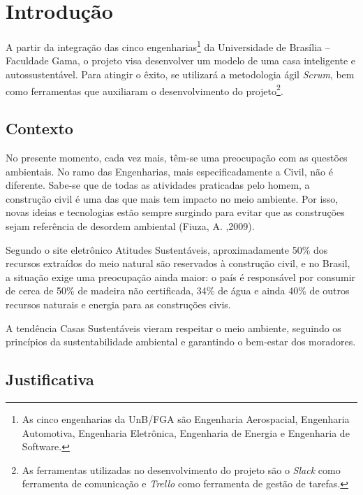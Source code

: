 \chapter[Introdução]{Introdução}

	A partir da integração das cinco engenharias\footnote{As cinco engenharias da UnB/FGA são Engenharia Aerospacial, Engenharia Automotiva, Engenharia Eletrônica, Engenharia de Energia e Engenharia de Software.} da Universidade de Brasília -- Faculdade Gama, o projeto visa desenvolver um modelo de uma casa inteligente e autossustentável. Para atingir o êxito, se utilizará a metodologia ágil \textit{Scrum}, bem como ferramentas que auxiliaram o desenvolvimento do projeto\footnote{As ferramentas utilizadas no desenvolvimento do projeto são o \textit{Slack} como ferramenta de comunicação e \textit{Trello} como ferramenta de gestão de tarefas.}.

\section{Contexto}

	No presente momento, cada vez mais, têm-se uma preocupação com as questões ambientais. No ramo das Engenharias, mais especificadamente a Civil, não é diferente. Sabe-se que de todas as atividades praticadas pelo homem, a construção civil é uma das que mais tem impacto no meio ambiente. Por isso, novas ideias e tecnologias estão sempre surgindo para evitar que as construções sejam referência de desordem ambiental (Fiuza, A. ,2009).

	Segundo o site eletrônico Atitudes Sustentáveis, aproximadamente 50\% dos recursos extraídos do meio natural são reservados à construção civil, e no Brasil, a situação exige uma preocupação ainda maior: o país é responsável por consumir de cerca de 50\% de madeira não certificada, 34\% de água e ainda 40\% de outros recursos naturais e energia para as construções civis.


	A tendência Casas Sustentáveis vieram respeitar o meio ambiente, seguindo os princípios da sustentabilidade ambiental e garantindo o bem-estar dos moradores.


\section{Justificativa}

